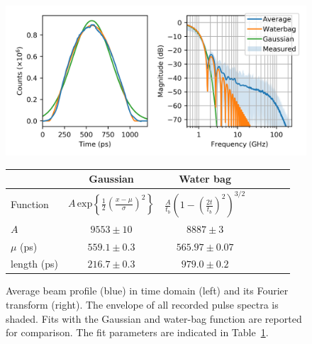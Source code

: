 \begin{figure}[!t]
\centering
\includegraphics[scale=1, keepaspectratio]{pictures/AVG-vs-Waterbag}
\caption{Average beam profile (blue) in time domain (left) and its Fourier transform (right). The envelope of all recorded pulse spectra is shaded. Fits with the Gaussian and water-bag function are reported for comparison. The fit parameters are indicated in Table~\ref{tab:average_params}.}
\label{fig:fft_avg}

\vspace{3mm}

\begin{tabular}{l c c c c c c}
\toprule
        & Gaussian      &   Water bag\\
\midrule
Function    &  $A \, \text{exp} \left\{ \frac{1}{2}(\frac{x-\mu}{\sigma})^2   \right\}$       & $\frac{A}{t_b} \left( 1 - \left( \frac{2t}{t_b}   \right)^2  \right)^{3/2}$ \\\rule{0pt}{2.5ex}
$A$         &  $9553\pm10$      &   $8887\pm3$ \\
$\mu$ (ps)  &  $559.1\pm0.3$    &   $565.97\pm0.07$ \\
length (ps) &   $216.7\pm0.3$   &   $979.0\pm 0.2$ \\
\bottomrule
\end{tabular}
 \label{tab:average_params}


\end{figure}


